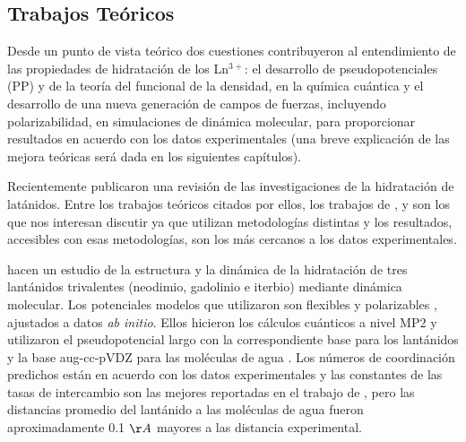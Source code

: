 \subsection{Trabajos Te\'oricos}
Desde un punto de vista te\'orico dos cuestiones contribuyeron
al entendimiento de las propiedades de hidrataci\'on de los 
Ln$^{3+}$: el desarrollo de pseudopotenciales (PP) y de la teor\'ia 
del funcional de la densidad, en la qu\'imica cu\'antica y el 
desarrollo de una nueva generaci\'on de campos de fuerzas, 
incluyendo polarizabilidad, en simulaciones de din\'amica molecular,
para proporcionar resultados en acuerdo con los datos experimentales
\citep{Dang2012} (una breve explicaci\'on de las mejora te\'oricas 
ser\'a dada en los siguientes cap\'itulos).

Recientemente \cite{Dang2012} publicaron una revisi\'on de las 
investigaciones de la hidrataci\'on de lat\'anidos. Entre los 
trabajos te\'oricos citados por ellos, los trabajos de 
\cite{Vill2009}, \cite{Ciup2010} y \cite{Kuta2010} son los que nos 
interesan discutir ya que utilizan metodolog\'ias distintas y los
resultados, accesibles con esas metodolog\'ias, son los m\'as 
cercanos a los datos experimentales. 

\citeauthor{Vill2009} hacen un estudio de la estructura y la 
din\'amica de la hidrataci\'on de tres lant\'anidos trivalentes 
(neodimio, gadolinio e iterbio) mediante din\'amica molecular. Los 
potenciales modelos que utilizaron son flexibles y polarizables 
\citep{Sain2000}, ajustados a datos {\it ab initio}. Ellos hicieron 
los c\'alculos cu\'anticos a nivel MP2 y utilizaron el 
pseudopotencial largo con la correspondiente base \citep{Dolg1989} 
para los lant\'anidos y la base aug-cc-pVDZ para las mol\'eculas de 
agua \citep{Dunn1989}. Los n\'umeros de coordinaci\'on predichos 
est\'an en acuerdo con los datos experimentales y las constantes de 
las tasas de intercambio son las mejores reportadas en el trabajo de 
\cite{Dang2012}, pero las distancias promedio del lant\'anido a las 
mol\'eculas de agua fueron aproximadamente 0.1 $\AA$  mayores a las 
distancia experimental.


